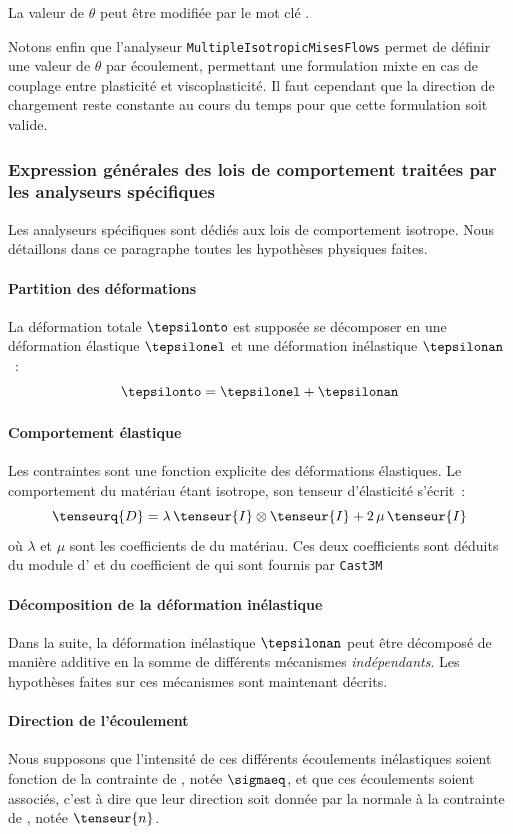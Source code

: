 \documentclass[rectoverso,pleiades,pstricks,leqno,anti]{texmf/note_technique_2010}
\makeatletter
\newcommand{\castem}{\texttt{Cast3M}}
\newcommand{\mkey}[1]{\index{mkeys}{#1@\symbol{64}#1}{\texttt{@#1}}}
\makeatother
\begin{document}
La valeur de \(\theta\) peut être modifiée par le mot clé
\mkey{Theta}.

Notons enfin que l'analyseur \texttt{Multiple\-Isotropic\-Mises\-Flows}
permet de définir une valeur de \(\theta\) par écoulement, permettant
une formulation mixte en cas de couplage entre plasticité et
viscoplasticité. Il faut cependant que la direction de chargement reste
constante au cours du temps pour que cette formulation soit valide.

\subsubsection{Expression générales des lois de comportement traitées
  par les analyseurs spécifiques}

Les analyseurs spécifiques sont dédiés aux lois de comportement
isotrope. Nous détaillons dans ce paragraphe toutes les hypothèses
physiques faites.

\paragraph{Partition des déformations} La déformation totale
\(\tepsilonto\) est supposée se décomposer en une déformation élastique
\(\tepsilonel\) et une déformation inélastique \(\tepsilonan\)~:
\[
\tepsilonto = \tepsilonel + \tepsilonan
\]

\paragraph{Comportement élastique} Les contraintes sont une fonction
explicite des déformations élastiques. Le comportement du matériau
étant isotrope, son tenseur d'élasticité s'écrit~:
\[
\tenseurq{D}=\lambda\,\tenseur{I}\otimes\tenseur{I}+2\,\mu\,\tenseur{I}
\]
où \(\lambda\) et \(\mu\) sont les coefficients de  du
matériau. Ces deux coefficients sont déduits du module d' et
du coefficient de  qui sont fournis par \castem{}

\paragraph{Décomposition de la déformation inélastique} Dans la suite,
la déformation inélastique \(\tepsilonan\) peut être décomposé de
manière additive en la somme de différents mécanismes {\em
  indépendants}. Les hypothèses faites sur ces mécanismes sont
maintenant décrits.

\paragraph{Direction de l'écoulement} Nous supposons que l'intensité de
ces différents écoulements inélastiques soient fonction de la contrainte
de , notée \(\sigmaeq\), et que ces écoulements soient
associés, c'est à dire que leur direction soit donnée par la normale à
la contrainte de , notée \(\tenseur{n}\).
\end{document}
